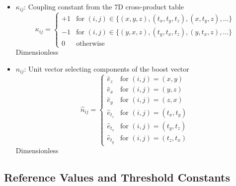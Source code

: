 \documentclass{article}
\begin{document}
\begin{itemize}
\item $\kappa_{ij}$: Coupling constant from the 7D cross-product table
    \begin{equation}
    \kappa_{ij} = \begin{cases}
    +1 & \text{for } (i,j) \in \{(x,y,z), (t_x,t_y,t_z), (x,t_y,z), \ldots\} \\
    -1 & \text{for } (i,j) \in \{(y,x,z), (t_y,t_x,t_z), (y,t_x,z), \ldots\} \\
    0 & \text{otherwise}
    \end{cases}
    \end{equation}
    Dimensionless
    
\item $\hat{n}_{ij}$: Unit vector selecting components of the boost vector
    \begin{equation}
    \hat{n}_{ij} = \begin{cases}
    \hat{e}_z & \text{for } (i,j) = (x,y) \\
    \hat{e}_x & \text{for } (i,j) = (y,z) \\
    \hat{e}_y & \text{for } (i,j) = (z,x) \\
    \hat{e}_{t_z} & \text{for } (i,j) = (t_x,t_y) \\
    \hat{e}_{t_x} & \text{for } (i,j) = (t_y,t_z) \\
    \hat{e}_{t_y} & \text{for } (i,j) = (t_z,t_x)
    \end{cases}
    \end{equation}
    Dimensionless
\end{itemize}

\subsection{Reference Values and Threshold Constants}
\end{document}
